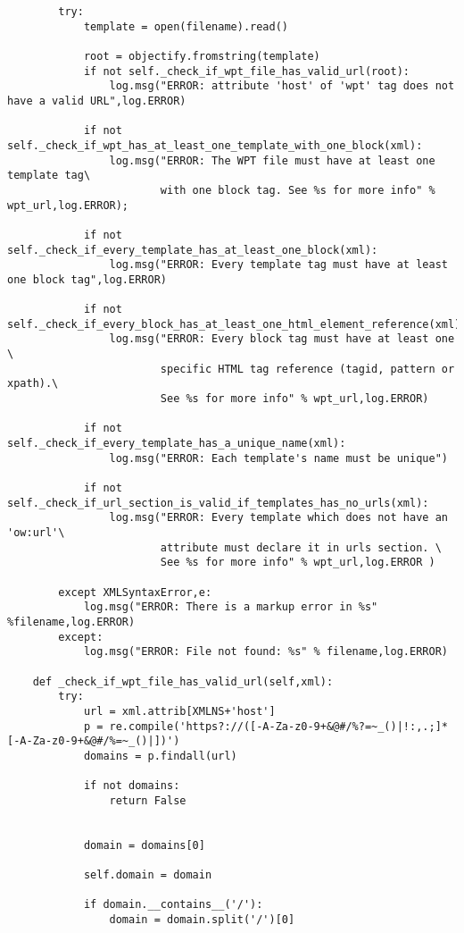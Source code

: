 \begin{lstlisting}
        try:
            template = open(filename).read()

            root = objectify.fromstring(template)
            if not self._check_if_wpt_file_has_valid_url(root):
                log.msg("ERROR: attribute 'host' of 'wpt' tag does not have a valid URL",log.ERROR)

            if not self._check_if_wpt_has_at_least_one_template_with_one_block(xml):
                log.msg("ERROR: The WPT file must have at least one template tag\
                        with one block tag. See %s for more info" % wpt_url,log.ERROR);
    
            if not self._check_if_every_template_has_at_least_one_block(xml):
                log.msg("ERROR: Every template tag must have at least one block tag",log.ERROR)
    
            if not self._check_if_every_block_has_at_least_one_html_element_reference(xml):
                log.msg("ERROR: Every block tag must have at least one \
                        specific HTML tag reference (tagid, pattern or xpath).\
                        See %s for more info" % wpt_url,log.ERROR)

            if not self._check_if_every_template_has_a_unique_name(xml):
                log.msg("ERROR: Each template's name must be unique")
            
            if not self._check_if_url_section_is_valid_if_templates_has_no_urls(xml):
                log.msg("ERROR: Every template which does not have an 'ow:url'\
                        attribute must declare it in urls section. \
                        See %s for more info" % wpt_url,log.ERROR )

        except XMLSyntaxError,e:
            log.msg("ERROR: There is a markup error in %s" %filename,log.ERROR)
        except:
            log.msg("ERROR: File not found: %s" % filename,log.ERROR)
       
    def _check_if_wpt_file_has_valid_url(self,xml):
        try:
            url = xml.attrib[XMLNS+'host']
            p = re.compile('https?://([-A-Za-z0-9+&@#/%?=~_()|!:,.;]*[-A-Za-z0-9+&@#/%=~_()|])')
            domains = p.findall(url)
            
            if not domains: 
                return False
    
     
            domain = domains[0]

            self.domain = domain 

            if domain.__contains__('/'):
                domain = domain.split('/')[0]
     

\end{lstlisting}
